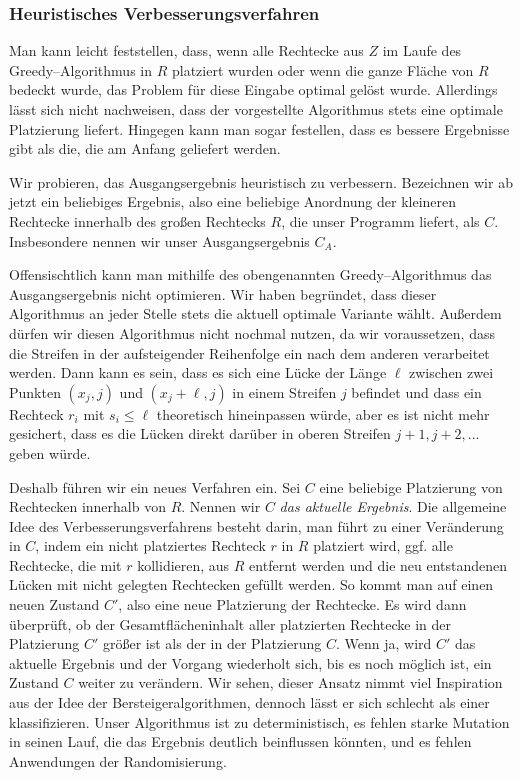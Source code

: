 \subsubsection{Heuristisches Verbesserungsverfahren}\label{sec:verbesserung}
Man kann leicht feststellen, dass, wenn alle Rechtecke aus $Z$ im Laufe des
Greedy--Algorithmus in $R$ platziert wurden oder wenn die ganze Fläche von $R$ bedeckt wurde, 
das Problem für diese Eingabe optimal gelöst wurde.
Allerdings lässt sich nicht nachweisen, dass der vorgestellte Algorithmus 
stets eine optimale Platzierung liefert.
Hingegen kann man sogar festellen, dass es bessere Ergebnisse gibt als die,
die am Anfang geliefert werden. 


Wir probieren, das Ausgangsergebnis heuristisch zu verbessern.
Bezeichnen wir ab jetzt ein beliebiges Ergebnis, also eine beliebige Anordnung
der kleineren Rechtecke innerhalb des großen Rechtecks $R$, die unser Programm liefert, 
als $C$. Insbesondere nennen wir unser Ausgangsergebnis $C_A$.


Offensischtlich kann man mithilfe des obengenannten Greedy--Algorithmus 
das Ausgangsergebnis nicht optimieren. Wir haben begründet, dass dieser Algorithmus
an jeder Stelle stets die aktuell optimale Variante wählt. 
Außerdem dürfen wir diesen Algorithmus nicht nochmal nutzen,
da wir voraussetzen, dass die Streifen in der aufsteigender Reihenfolge ein nach dem anderen
verarbeitet werden. Dann kann es sein, dass es sich eine Lücke der Länge $\ell$
zwischen zwei Punkten $(x_j, j)$ und 
$(x_j + \ell, j)$ in einem Streifen $j$ befindet
und dass ein Rechteck $r_i$ mit $s_i \leqslant \ell$ theoretisch hineinpassen würde, aber
es ist nicht mehr gesichert, dass es die Lücken direkt darüber in oberen Streifen $j+1, j+2, ...$
geben würde.


Deshalb führen wir ein neues Verfahren ein. 
Sei $C$ eine beliebige Platzierung von Rechtecken innerhalb von $R$.
Nennen wir $C$ \textit{das aktuelle Ergebnis}. 
Die allgemeine Idee des Verbesserungsverfahrens besteht darin,
man führt zu einer Veränderung in $C$, indem
ein nicht platziertes Rechteck $r$ in $R$ platziert wird, ggf. 
alle Rechtecke, die mit $r$ kollidieren, aus $R$ entfernt werden und
die neu entstandenen Lücken mit nicht gelegten Rechtecken gefüllt werden. 
So kommt man auf einen neuen Zustand $C'$, also eine neue Platzierung der Rechtecke.
Es wird dann überprüft, ob der Gesamtflächeninhalt aller platzierten Rechtecke in der Platzierung $C'$
größer ist als der in der Platzierung $C$.
Wenn ja, wird $C'$ das aktuelle Ergebnis und der Vorgang wiederholt sich,
bis es noch möglich ist, ein Zustand $C$ weiter zu verändern.
Wir sehen, dieser Ansatz nimmt viel Inspiration aus der Idee der Bersteigeralgorithmen,
dennoch lässt er sich schlecht als einer klassifizieren.
Unser Algorithmus ist zu deterministisch,
es fehlen starke Mutation in seinen Lauf, die das Ergebnis deutlich beinflussen könnten,
und es fehlen Anwendungen der Randomisierung.


